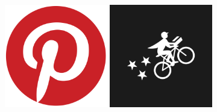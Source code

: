 \documentclass{beamer}
\begin{document}
\begin{frame}

\begin{figure}
    \centering
    \begin{minipage}{0.5\textwidth}
        \centering
        \includegraphics[width=0.4\textwidth]{pic/pinterest.png} %
    \end{minipage}\hfill
    \begin{minipage}{0.5\textwidth}
        \centering
        \includegraphics[width=0.4\textwidth]{pic/postmates.png} %
    \end{minipage}
\end{figure}


\end{frame}
\end{document}
